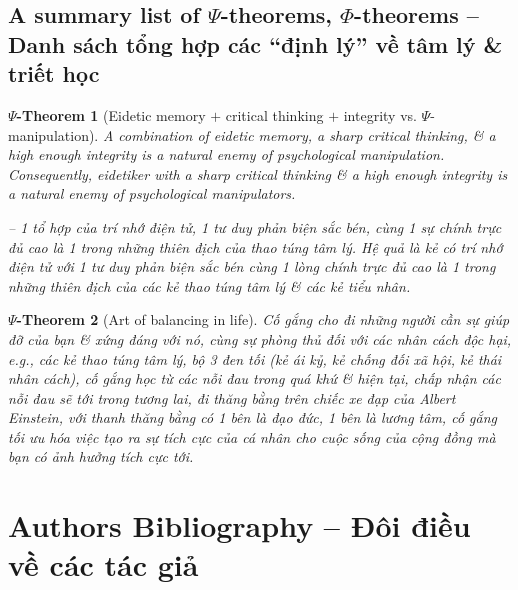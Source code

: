 \documentclass[12pt]{article}
\newtheorem{psy-theorem}{$\Psi$-Theorem}
\begin{document}
\subsection{A summary list of $\Psi$-theorems, $\Phi$-theorems -- Danh sách tổng hợp các ``định lý'' về tâm lý \& triết học}

\begin{psy-theorem}[Eidetic memory $+$ critical thinking $+$ integrity vs. $\Psi$-manipulation]
	A combination of eidetic memory, a sharp critical thinking, \& a high enough integrity is a natural enemy of psychological manipulation. Consequently, eidetiker with a sharp critical thinking \& a high enough integrity is a natural enemy of psychological manipulators.
	
	-- 1 tổ hợp của trí nhớ điện tử, 1 tư duy phản biện sắc bén, cùng 1 sự chính trực đủ cao là 1 trong những thiên địch của thao túng tâm lý. Hệ quả là kẻ có trí nhớ điện tử với 1 tư duy phản biện sắc bén cùng 1 lòng chính trực đủ cao là 1 trong những thiên địch của các kẻ thao túng tâm lý \& các kẻ tiểu nhân.
\end{psy-theorem}

\begin{psy-theorem}[Art of balancing in life]
	Cố gắng cho đi những người cần sự giúp đỡ của bạn \& xứng đáng với nó, cùng sự phòng thủ đối với các nhân cách độc hại, e.g., các kẻ thao túng tâm lý, bộ 3 đen tối (kẻ ái kỷ, kẻ chống đối xã hội, kẻ thái nhân cách), cố gắng học từ các nỗi đau trong quá khứ \& hiện tại, chấp nhận các nỗi đau sẽ tới trong tương lai, đi thăng bằng trên chiếc xe đạp của {\sc Albert Einstein}, với thanh thăng bằng có 1 bên là đạo đức, 1 bên là lương tâm, cố gắng tối ưu hóa việc tạo ra sự tích cực của cá nhân cho cuộc sống của cộng đồng mà bạn có ảnh hưởng tích cực tới.
\end{psy-theorem}

\section{Authors Bibliography -- Đôi điều về các tác giả}
\end{document}
